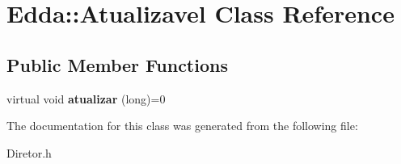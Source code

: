 \hypertarget{class_edda_1_1_atualizavel}{
\section{Edda::Atualizavel Class Reference}
\label{class_edda_1_1_atualizavel}
}
\subsection*{Public Member Functions}
\begin{DoxyCompactItemize}
\item 
\hypertarget{class_edda_1_1_atualizavel_a5b8c6f41e2fd8d47612d0b949efe2b14}{
virtual void {\bfseries atualizar} (long)=0}
\label{class_edda_1_1_atualizavel_a5b8c6f41e2fd8d47612d0b949efe2b14}

\end{DoxyCompactItemize}


The documentation for this class was generated from the following file:\begin{DoxyCompactItemize}
\item 
Diretor.h\end{DoxyCompactItemize}
